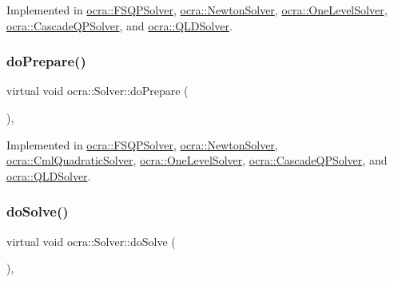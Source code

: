 Implemented in \hyperlink{classocra_1_1FSQPSolver_a792dc111362746ea36b2789a5442100c}{ocra\+::\+F\+S\+Q\+P\+Solver}, \hyperlink{classocra_1_1NewtonSolver_ae356c90b0931d0cf3571039e52647ef4}{ocra\+::\+Newton\+Solver}, \hyperlink{classocra_1_1OneLevelSolver_a823e51eeddc6c8fd58a6aa2409ac3c07}{ocra\+::\+One\+Level\+Solver}, \hyperlink{classocra_1_1CascadeQPSolver_af180fd8b7323b29246512af6109845d2}{ocra\+::\+Cascade\+Q\+P\+Solver}, and \hyperlink{classocra_1_1QLDSolver_a1d6f5101e1cc2b6bc8256ac2d3e0d710}{ocra\+::\+Q\+L\+D\+Solver}.

\hypertarget{classocra_1_1Solver_a9ab90e87025e3da7239141c48d28ab4a}{}\label{classocra_1_1Solver_a9ab90e87025e3da7239141c48d28ab4a} 
\subsubsection{\texorpdfstring{do\+Prepare()}{doPrepare()}}
{\footnotesize\ttfamily virtual void ocra\+::\+Solver\+::do\+Prepare (\begin{DoxyParamCaption}{ }\end{DoxyParamCaption})\hspace{0.3cm}{\ttfamily [protected]}, {}}



Implemented in \hyperlink{classocra_1_1FSQPSolver_a94faaa47095bc05870c1b834621cf232}{ocra\+::\+F\+S\+Q\+P\+Solver}, \hyperlink{classocra_1_1NewtonSolver_af717009e42a86f10a793f172883cc93d}{ocra\+::\+Newton\+Solver}, \hyperlink{classocra_1_1CmlQuadraticSolver_a6139c2cd572e403badc0451bf0ea9d90}{ocra\+::\+Cml\+Quadratic\+Solver}, \hyperlink{classocra_1_1OneLevelSolver_a458cc8d801826b3b75c21212e39e7ca9}{ocra\+::\+One\+Level\+Solver}, \hyperlink{classocra_1_1CascadeQPSolver_a2ccca21b47e23667be94cd215c890d5e}{ocra\+::\+Cascade\+Q\+P\+Solver}, and \hyperlink{classocra_1_1QLDSolver_ac590e2b4c851042177e8e4b84f946ced}{ocra\+::\+Q\+L\+D\+Solver}.

\hypertarget{classocra_1_1Solver_ace2d7cfe741611de6dc87a0de7e7f3a9}{}\label{classocra_1_1Solver_ace2d7cfe741611de6dc87a0de7e7f3a9} 
\subsubsection{\texorpdfstring{do\+Solve()}{doSolve()}}
{\footnotesize\ttfamily virtual void ocra\+::\+Solver\+::do\+Solve (\begin{DoxyParamCaption}{ }\end{DoxyParamCaption})\hspace{0.3cm}{\ttfamily [protected]}, {}}



